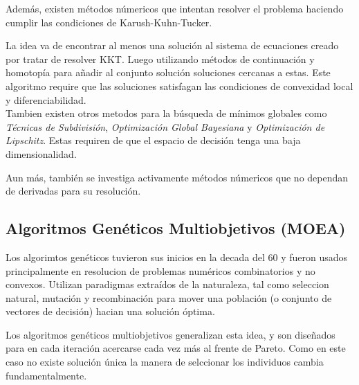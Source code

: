 Adem\'as, existen m\'etodos n\'umericos que intentan resolver el problema haciendo cumplir las condiciones de Karush-Kuhn-Tucker.

La idea va de encontrar al menos una soluci\'on al sistema de ecuaciones creado por tratar de resolver KKT. Luego utilizando m\'etodos de continuaci\'on y homotop\'ia para añadir al conjunto soluci\'on soluciones cercanas a estas. Este algoritmo require que las soluciones satisfagan las condiciones de convexidad local y diferenciabilidad.\\

Tambien existen otros metodos para la b\'usqueda de m\'inimos globales como \textit{T\'ecnicas de Subdivisi\'on}, \textit{Optimizaci\'on Global Bayesiana} y \textit{Optimizaci\'on de Lipschitz}. Estas requiren de que el espacio de decisi\'on tenga una baja dimensionalidad.

Aun m\'as, tambi\'en se investiga activamente m\'etodos n\'umericos que no dependan de derivadas para su resoluci\'on.

\subsection{Algoritmos Gen\'eticos Multiobjetivos (MOEA)}

Los algorimtos gen\'eticos tuvieron sus inicios en la decada del 60 y fueron usados principalmente en resolucion de problemas num\'ericos combinatorios y no convexos. Utilizan paradigmas extra\'idos de la naturaleza, tal como seleccion natural, mutaci\'on y recombinaci\'on para mover una poblaci\'on (o conjunto de vectores de decisi\'on) hacian una soluci\'on \'optima.

Los algoritmos gen\'eticos multiobjetivos generalizan esta idea, y son diseñados para en cada iteraci\'on acercarse cada vez m\'as al frente de Pareto. Como en este caso no existe soluci\'on \'unica la manera de selccionar los individuos cambia fundamentalmente.

